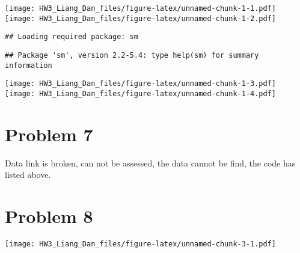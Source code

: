 \documentclass[]{article}
\newenvironment{Shaded}{\begin{snugshade}}{\end{snugshade}}
\newcommand{\CommentTok}[1]{\textcolor[rgb]{0.56,0.35,0.01}{\textit{#1}}}
\begin{document}
\texttt{[image: HW3\_Liang\_Dan\_files/figure-latex/unnamed-chunk-1-1.pdf]}
\texttt{[image: HW3\_Liang\_Dan\_files/figure-latex/unnamed-chunk-1-2.pdf]}

\begin{verbatim}
## Loading required package: sm
\end{verbatim}

\begin{verbatim}
## Package 'sm', version 2.2-5.4: type help(sm) for summary information
\end{verbatim}

\texttt{[image: HW3\_Liang\_Dan\_files/figure-latex/unnamed-chunk-1-3.pdf]}
\texttt{[image: HW3\_Liang\_Dan\_files/figure-latex/unnamed-chunk-1-4.pdf]}

\section{Problem 7}\label{problem-7}

\begin{Shaded}
\end{Shaded}

Data link is broken, can not be assessed, the data cannot be find, the
code has listed above.

\section{Problem 8}\label{problem-8}

\texttt{[image: HW3\_Liang\_Dan\_files/figure-latex/unnamed-chunk-3-1.pdf]}
\end{document}
